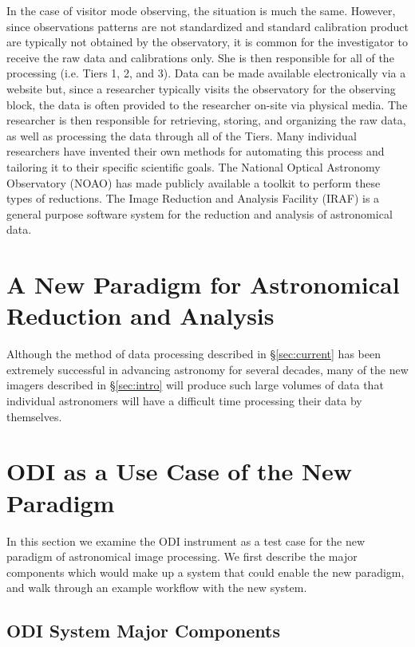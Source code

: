 \documentclass[10pt,conference]{IEEEtran}
\begin{document}
In the case of visitor mode observing, the situation is much the same. However, since observations patterns are not standardized and standard calibration product are typically not obtained by the observatory, it is common for the investigator to receive the raw data and calibrations only. She is then responsible for all of the processing (i.e. Tiers 1, 2, and 3). Data can be made available electronically via a website but, since a researcher typically visits the observatory for the observing block, the data is often provided to the researcher on-site via physical media. The researcher is then responsible for retrieving, storing, and organizing the raw data, as well as processing the data through all of the Tiers. Many individual researchers have invented their own methods for automating this process and tailoring it to their specific scientific goals. The National Optical Astronomy Observatory (NOAO) has made publicly available a toolkit to perform these types of reductions. The Image Reduction and Analysis Facility (IRAF) is a general purpose software system for the reduction and analysis of astronomical data.

\section{A New Paradigm for Astronomical Reduction and Analysis}\label{sec:rev}

Although the method of data processing described in \S\ref{sec:current} has been extremely successful in advancing astronomy for several decades, many of the new imagers described in \S\ref{sec:intro} will produce such large volumes of data that individual astronomers will have a difficult time
processing their data by themselves. 

\section{ODI as a Use Case of the New Paradigm}\label{sec:ODI}

In this section we examine the ODI instrument as a test case for the new paradigm of astronomical image processing. We first describe the major components which would make up a system that could enable the new paradigm, and walk through an example workflow with the new system. 

\subsection{ODI System Major Components}\label{sec:components}
\end{document}
